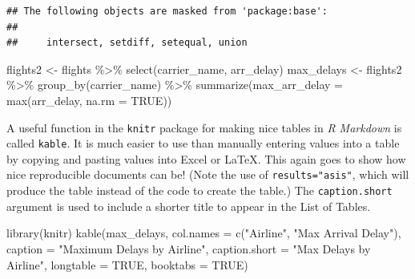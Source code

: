 \documentclass[print]{nuthesis}
\newenvironment{Shaded}{\begin{snugshade}}{\end{snugshade}}
\newcommand{\AttributeTok}[1]{\textcolor[rgb]{0.77,0.63,0.00}{#1}}
\newcommand{\ConstantTok}[1]{\textcolor[rgb]{0.00,0.00,0.00}{#1}}
\newcommand{\FunctionTok}[1]{\textcolor[rgb]{0.00,0.00,0.00}{#1}}
\newcommand{\NormalTok}[1]{#1}
\newcommand{\OtherTok}[1]{\textcolor[rgb]{0.56,0.35,0.01}{#1}}
\newcommand{\SpecialCharTok}[1]{\textcolor[rgb]{0.00,0.00,0.00}{#1}}
\newcommand{\StringTok}[1]{\textcolor[rgb]{0.31,0.60,0.02}{#1}}
\begin{document}
\begin{verbatim}
## The following objects are masked from 'package:base':
## 
##     intersect, setdiff, setequal, union
\end{verbatim}

\begin{Shaded}
\begin{Highlighting}[]
\NormalTok{flights2 }\OtherTok{\textless{}{-}}\NormalTok{ flights }\SpecialCharTok{\%\textgreater{}\%} \FunctionTok{select}\NormalTok{(carrier\_name, arr\_delay)}
\NormalTok{max\_delays }\OtherTok{\textless{}{-}}\NormalTok{ flights2 }\SpecialCharTok{\%\textgreater{}\%} \FunctionTok{group\_by}\NormalTok{(carrier\_name) }\SpecialCharTok{\%\textgreater{}\%} 
    \FunctionTok{summarize}\NormalTok{(}\AttributeTok{max\_arr\_delay =} \FunctionTok{max}\NormalTok{(arr\_delay, }\AttributeTok{na.rm =} \ConstantTok{TRUE}\NormalTok{))}
\end{Highlighting}
\end{Shaded}

A useful function in the \texttt{knitr} package for making nice tables in \emph{R Markdown} is called \texttt{kable}. It is much easier to use than manually entering values into a table by copying and pasting values into Excel or LaTeX. This again goes to show how nice reproducible documents can be! (Note the use of \texttt{results="asis"}, which will produce the table instead of the code to create the table.) The \texttt{caption.short} argument is used to include a shorter title to appear in the List of Tables.

\begin{Shaded}
\begin{Highlighting}[]
\FunctionTok{library}\NormalTok{(knitr)}
\FunctionTok{kable}\NormalTok{(max\_delays, }\AttributeTok{col.names =} \FunctionTok{c}\NormalTok{(}\StringTok{"Airline"}\NormalTok{, }\StringTok{"Max Arrival Delay"}\NormalTok{), }
    \AttributeTok{caption =} \StringTok{"Maximum Delays by Airline"}\NormalTok{, }\AttributeTok{caption.short =} \StringTok{"Max Delays by Airline"}\NormalTok{, }
    \AttributeTok{longtable =} \ConstantTok{TRUE}\NormalTok{, }\AttributeTok{booktabs =} \ConstantTok{TRUE}\NormalTok{)}
\end{Highlighting}
\end{Shaded}
\end{document}
